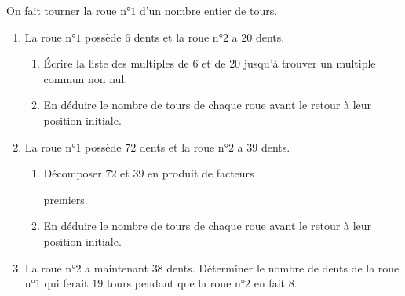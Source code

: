 \begin{exercice*}[Engrenages]
        On fait tourner la roue n°$1$ d'un nombre entier de tours.
    \begin{enumerate}
        \item     La roue n°$1$ possède $6$ dents et la roue n°$2$ a $20$ dents.
        \begin{enumerate}
            \item Écrire la liste des multiples de $6$ et de $20$ jusqu'à trouver un multiple commun non nul.
            \item En déduire le nombre de tours de chaque roue avant le retour à leur position initiale.
        \end{enumerate}
        \item La roue n°$1$ possède $72$ dents et la roue n°$2$ a $39$ dents.
        \begin{enumerate}
            \item Décomposer $72$ et $39$ en produit de facteurs 
            
            premiers.
            \item En déduire le nombre de tours de chaque roue avant le retour à leur position initiale.
        \end{enumerate}
        \item La roue n°$2$ a maintenant $38$ dents. Déterminer le nombre de dents de la roue n°$1$ qui ferait $19$ tours pendant que la roue n°$2$ en fait $8$.
    \end{enumerate}        
\end{exercice*}

